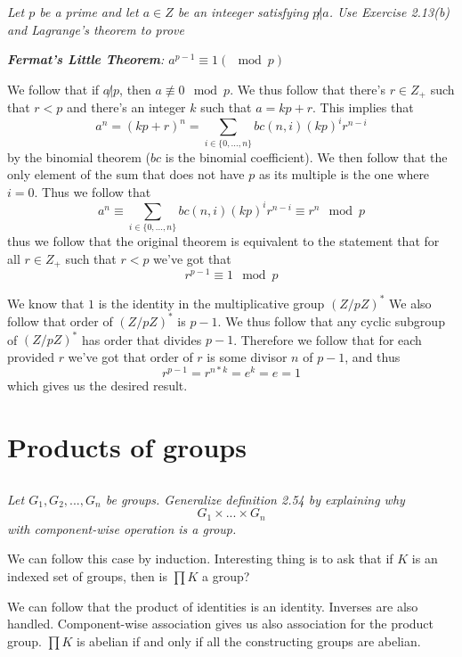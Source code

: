 \documentclass[11pt,oneside,titlepage]{book}
\newcommand{\set}[1]{\{ #1 \}}
\begin{document}
\textit{Let $p$ be a prime and let $a \in Z$ be an inteeger satisfying
$p \not | a$. Use Exercise 2.13(b) and Lagrange's theorem to prove}

\textit{\textbf{Fermat's Little Theorem}: $a^{p - 1} \equiv 1 (\mod
p)$}

We follow that if $a \not | p$, then $a \not \equiv 0 \mod p$. We thus
follow that there's $r \in Z_+$ such that $r < p$ and there's an
integer $k$ such that $a = kp + r$. This implies that
$$a^{n} = (kp + r)^n = \sum_{i \in \set{0, ...,  n}}{bc(n, i)(kp)^{i} r^{n - i}}$$
by the binomial theorem ($bc$ is the binomial coefficient). We then
follow that the only element of the sum that does not have $p$ as its
multiple is the one where $i = 0$. Thus we follow that
$$a^{n} \equiv  \sum_{i \in \set{0, ...,  n}}{bc(n, i)(kp)^{i} r^{n - i}} \equiv r^n \mod p$$
thus we follow that the original theorem is equivalent to the
statement that for all $r \in Z_+$ such that $r < p$ we've got that
$$r^{p - 1} \equiv 1 \mod p$$

We know that $1$ is the identity in the multiplicative group
$(Z/pZ)^*$ We also follow that order of $(Z/pZ)^*$ is $p - 1$. We thus
follow that any cyclic subgroup of $(Z/pZ)^*$ has order that divides
$p - 1$. Therefore we follow that for each provided $r$ we've got that
order of $r$ is some divisor $n$ of $p - 1$, and thus
$$r^{p - 1} = r^{n * k} = e^k = e = 1$$
which gives us the desired result.

\section{Products of groups}

\subsection{}

\textit{Let $G_1, G_2, ..., G_n$ be groups. Generalize definition 2.54
by explaining why
  $$G_1 \times ... \times G_n$$
  with component-wise operation is a group.}

We can follow this case by induction. Interesting thing is to ask that
if $K$ is an indexed set of groups, then is $\prod{K}$ a group?

We can follow that the product of identities is an identity. Inverses
are also handled.  Component-wise association gives us also
association for the product group. $\prod{K}$ is abelian if and only
if all the constructing groups are abelian.
\end{document}
